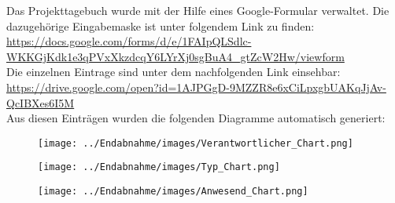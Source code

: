 Das Projekttagebuch wurde mit der Hilfe eines Google-Formular verwaltet. Die dazugehörige Eingabemaske ist unter folgendem Link zu finden: \url{https://docs.google.com/forms/d/e/1FAIpQLSdlc-WKKGjKdk1e3qPVxXkzdcqY6LYrXj0sgBuA4_gtZcW2Hw/viewform}\\
Die einzelnen Eintrage sind unter dem nachfolgenden Link einsehbar: \url{https://drive.google.com/open?id=1AJPGgD-9MZZR8e6xCiLpxgbUAKqJjAv-QcIBXes6I5M}\\
Aus diesen Einträgen wurden die folgenden Diagramme automatisch generiert:

\begin{figure}[H]
    \centering
    \texttt{[image: ../Endabnahme/images/Verantwortlicher\_Chart.png]}
\end{figure}

\begin{figure}[H]
    \centering
    \texttt{[image: ../Endabnahme/images/Typ\_Chart.png]}
\end{figure}

\begin{figure}[H]
    \centering
    \texttt{[image: ../Endabnahme/images/Anwesend\_Chart.png]}
\end{figure}